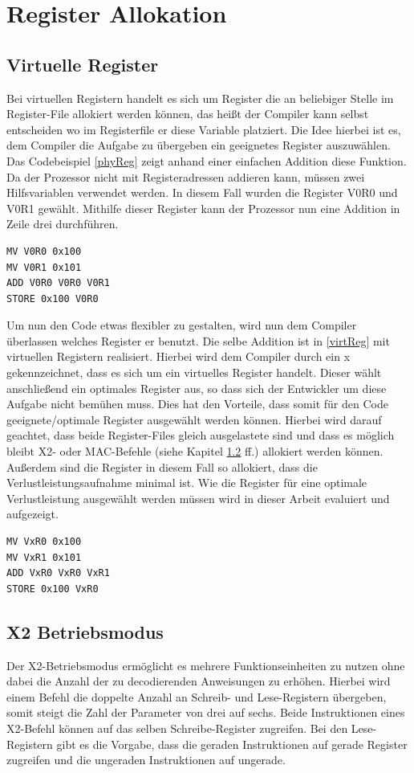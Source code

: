 \section{Register Allokation}
\label{sec:register allok}
\subsection{Virtuelle Register}
Bei virtuellen Registern handelt es sich um Register die an beliebiger Stelle im Register-File allokiert werden können, das heißt der Compiler kann selbst entscheiden wo im Registerfile er diese Variable platziert. 
Die Idee hierbei ist es, dem Compiler die Aufgabe zu übergeben ein geeignetes Register auszuwählen. Das Codebeispiel \ref{phyReg} zeigt anhand einer einfachen Addition diese Funktion. Da der Prozessor nicht mit Registeradressen addieren kann, müssen zwei Hilfsvariablen verwendet werden. In diesem Fall wurden die Register V0R0 und V0R1 gewählt. Mithilfe dieser Register kann der Prozessor nun eine Addition in Zeile drei durchführen.
\renewcommand{\lstlistingname}{Codebeispiel}
\begin{lstlisting}[frame=single, caption={physikalische Register},captionpos=b,label=phyReg]
MV V0R0 0x100
MV V0R1 0x101
ADD V0R0 V0R0 V0R1
STORE 0x100 V0R0
\end{lstlisting}
Um nun den Code etwas flexibler zu gestalten, wird  nun dem Compiler überlassen welches Register er benutzt. Die selbe Addition ist in \ref{virtReg} mit virtuellen Registern realisiert. Hierbei wird dem Compiler durch ein  x gekennzeichnet, dass es sich um ein virtuelles Register handelt. Dieser wählt anschließend ein optimales Register aus, so dass sich der Entwickler um diese Aufgabe nicht bemühen muss. Dies hat den Vorteile, dass somit für den Code geeignete/optimale Register ausgewählt werden können. Hierbei wird darauf geachtet, dass beide Register-Files gleich ausgelastete sind und dass es möglich bleibt X2- oder MAC-Befehle (siehe Kapitel \ref{subsec:x2Mode} ff.) allokiert werden können. Außerdem sind die Register in diesem Fall so allokiert, dass die Verlustleistungsaufnahme minimal ist. Wie die Register für eine optimale Verlustleistung ausgewählt werden müssen wird in dieser Arbeit evaluiert und aufgezeigt.

\begin{lstlisting}[frame=single,caption={virtuelle Register},captionpos=b,label=virtReg]
MV VxR0 0x100
MV VxR1 0x101
ADD VxR0 VxR0 VxR1
STORE 0x100 VxR0
\end{lstlisting}
\subsection{X2 Betriebsmodus}\label{subsec:x2Mode}
Der X2-Betriebsmodus ermöglicht es mehrere Funktionseinheiten zu nutzen ohne dabei die Anzahl der zu decodierenden Anweisungen zu erhöhen. Hierbei wird einem Befehl die doppelte Anzahl an Schreib- und Lese-Registern übergeben, somit steigt die Zahl der Parameter von drei auf sechs. Beide Instruktionen eines X2-Befehl können auf das selben Schreibe-Register zugreifen. Bei den Lese-Registern gibt es die Vorgabe, dass die geraden Instruktionen auf gerade Register zugreifen und die ungeraden Instruktionen auf ungerade.%
